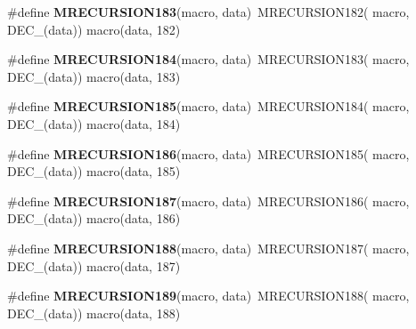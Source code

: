 \begin{DoxyCompactItemize}
\item 
\hypertarget{group__group__sam0__utils__mrecursion_gafe3e141260001214362a33542509fd0c}{}\#define {\bfseries M\+R\+E\+C\+U\+R\+S\+I\+O\+N183}(macro,  data)~M\+R\+E\+C\+U\+R\+S\+I\+O\+N182(  macro, D\+E\+C\+\_\+(data))   macro(data, 182)\label{group__group__sam0__utils__mrecursion_gafe3e141260001214362a33542509fd0c}

\item 
\hypertarget{group__group__sam0__utils__mrecursion_ga0fe22e5153970c4985a82aa915dfc9ce}{}\#define {\bfseries M\+R\+E\+C\+U\+R\+S\+I\+O\+N184}(macro,  data)~M\+R\+E\+C\+U\+R\+S\+I\+O\+N183(  macro, D\+E\+C\+\_\+(data))   macro(data, 183)\label{group__group__sam0__utils__mrecursion_ga0fe22e5153970c4985a82aa915dfc9ce}

\item 
\hypertarget{group__group__sam0__utils__mrecursion_ga302c7936253b9f780ea8a1ab5cd6e53b}{}\#define {\bfseries M\+R\+E\+C\+U\+R\+S\+I\+O\+N185}(macro,  data)~M\+R\+E\+C\+U\+R\+S\+I\+O\+N184(  macro, D\+E\+C\+\_\+(data))   macro(data, 184)\label{group__group__sam0__utils__mrecursion_ga302c7936253b9f780ea8a1ab5cd6e53b}

\item 
\hypertarget{group__group__sam0__utils__mrecursion_ga6f3d650ce8b765f93637e4a2e2b06db0}{}\#define {\bfseries M\+R\+E\+C\+U\+R\+S\+I\+O\+N186}(macro,  data)~M\+R\+E\+C\+U\+R\+S\+I\+O\+N185(  macro, D\+E\+C\+\_\+(data))   macro(data, 185)\label{group__group__sam0__utils__mrecursion_ga6f3d650ce8b765f93637e4a2e2b06db0}

\item 
\hypertarget{group__group__sam0__utils__mrecursion_gad8df14bd44a1a58706a68d4ee4c01b6e}{}\#define {\bfseries M\+R\+E\+C\+U\+R\+S\+I\+O\+N187}(macro,  data)~M\+R\+E\+C\+U\+R\+S\+I\+O\+N186(  macro, D\+E\+C\+\_\+(data))   macro(data, 186)\label{group__group__sam0__utils__mrecursion_gad8df14bd44a1a58706a68d4ee4c01b6e}

\item 
\hypertarget{group__group__sam0__utils__mrecursion_ga16bf5f92e153fe0044ed33ca46a5b259}{}\#define {\bfseries M\+R\+E\+C\+U\+R\+S\+I\+O\+N188}(macro,  data)~M\+R\+E\+C\+U\+R\+S\+I\+O\+N187(  macro, D\+E\+C\+\_\+(data))   macro(data, 187)\label{group__group__sam0__utils__mrecursion_ga16bf5f92e153fe0044ed33ca46a5b259}

\item 
\hypertarget{group__group__sam0__utils__mrecursion_ga5853c0c0f3dd91a6a68b624957e45b1f}{}\#define {\bfseries M\+R\+E\+C\+U\+R\+S\+I\+O\+N189}(macro,  data)~M\+R\+E\+C\+U\+R\+S\+I\+O\+N188(  macro, D\+E\+C\+\_\+(data))   macro(data, 188)\label{group__group__sam0__utils__mrecursion_ga5853c0c0f3dd91a6a68b624957e45b1f}


\end{DoxyCompactItemize}
